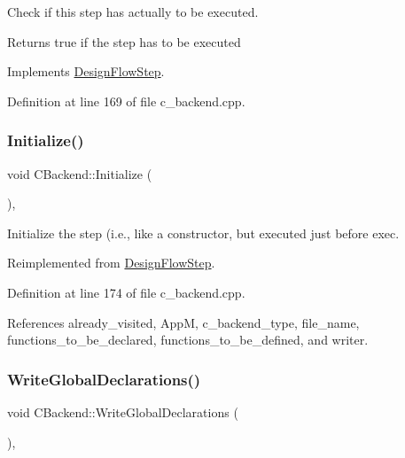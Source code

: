 Check if this step has actually to be executed. 

\begin{DoxyReturn}{Returns}
true if the step has to be executed 
\end{DoxyReturn}


Implements \hyperlink{classDesignFlowStep_a1783abe0c1d162a52da1e413d5d1ef05}{Design\+Flow\+Step}.



Definition at line 169 of file c\+\_\+backend.\+cpp.

\mbox{\label{classCBackend_a9c77a707b51fd49230668549eb1fd8db}} 
\subsubsection{\texorpdfstring{Initialize()}{Initialize()}}
{\footnotesize\ttfamily void C\+Backend\+::\+Initialize (\begin{DoxyParamCaption}{ }\end{DoxyParamCaption})\hspace{0.3cm}{\ttfamily [override]}, {\ttfamily [virtual]}}



Initialize the step (i.\+e., like a constructor, but executed just before exec. 



Reimplemented from \hyperlink{classDesignFlowStep_a44b50683382a094976e1d432a7784799}{Design\+Flow\+Step}.



Definition at line 174 of file c\+\_\+backend.\+cpp.



References already\+\_\+visited, AppM, c\+\_\+backend\+\_\+type, file\+\_\+name, functions\+\_\+to\+\_\+be\+\_\+declared, functions\+\_\+to\+\_\+be\+\_\+defined, and writer.

\mbox{\label{classCBackend_abe2034d792eff87acf84b9212bae06c9}} 
\subsubsection{\texorpdfstring{Write\+Global\+Declarations()}{WriteGlobalDeclarations()}}
{\footnotesize\ttfamily void C\+Backend\+::\+Write\+Global\+Declarations (\begin{DoxyParamCaption}{ }\end{DoxyParamCaption})\hspace{0.3cm}{\ttfamily [protected]}, {\ttfamily [virtual]}}



